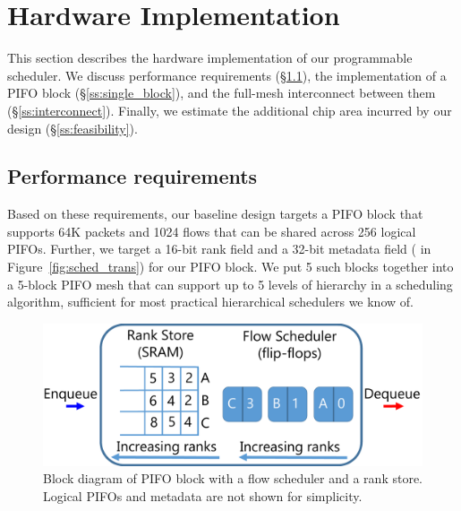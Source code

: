 \section{Hardware Implementation}
\label{s:hardware}
This section describes the hardware implementation of our programmable
scheduler. We discuss performance requirements
(\S\ref{ss:performance}), the implementation of a PIFO block
(\S\ref{ss:single_block}), and the full-mesh interconnect between them
(\S\ref{ss:interconnect}).  Finally, we estimate the additional chip area
incurred by our design (\S\ref{ss:feasibility}).

\subsection{Performance requirements}
\label{ss:performance}


 Based on these requirements, our baseline design targets a PIFO block that
supports 64K packets and 1024 flows that can be shared across 256 logical
PIFOs. Further, we target a 16-bit rank field and a 32-bit metadata field
( in Figure~\ref{fig:sched_trans}) for our PIFO block.
We put 5 such blocks together into a 5-block PIFO mesh that can
support up to 5 levels of hierarchy in a scheduling algorithm, sufficient for
most practical hierarchical schedulers we know of.

\begin{figure}[!t]
  \centering
  \includegraphics[width=0.6\columnwidth]{pifo_pifo_impl.pdf}
  \caption{Block diagram of PIFO block with a flow scheduler and a
   rank store. Logical PIFOs and metadata are not shown for simplicity.}
  \label{fig:pifo_impl}
\end{figure}

